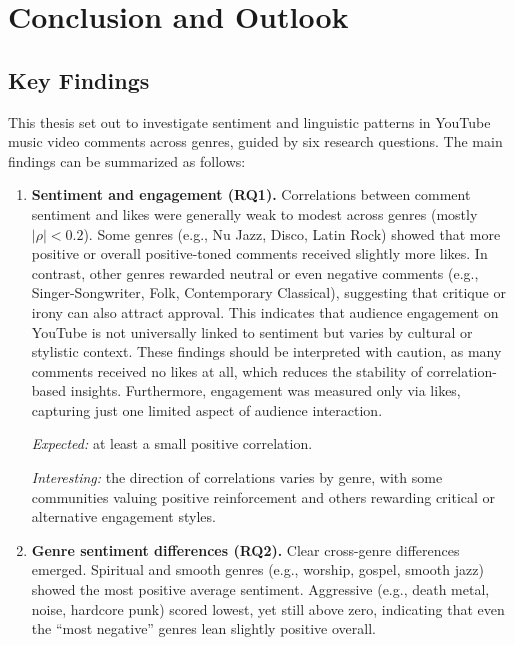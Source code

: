 \cleardoubleoddpage
\chapter{Conclusion and Outlook}
\label{sec:conclusion}

\section{Key Findings}
\label{subsec:results_keyfindings}

This thesis set out to investigate sentiment and linguistic patterns in YouTube music video comments across genres, guided by six research questions.  
The main findings can be summarized as follows:


\begin{enumerate}
\item \textbf{Sentiment and engagement (RQ1).}  
Correlations between comment sentiment and likes were generally weak to modest across genres (mostly $|\rho| < 0.2$).  
Some genres (e.g., Nu Jazz, Disco, Latin Rock) showed that more positive or overall positive-toned comments received slightly more likes.  
In contrast, other genres rewarded neutral or even negative comments (e.g., Singer-Songwriter, Folk, Contemporary Classical), suggesting that critique or irony can also attract approval.  
This indicates that audience engagement on YouTube is not universally linked to sentiment but varies by cultural or stylistic context.  
These findings should be interpreted with caution, as many comments received no likes at all, which reduces the stability of correlation-based insights.  
Furthermore, engagement was measured only via likes, capturing just one limited aspect of audience interaction.  

\textit{Expected:} at least a small positive correlation.  

\textit{Interesting:} the direction of correlations varies by genre, with some communities valuing positive reinforcement and others rewarding critical or alternative engagement styles.

\item \textbf{Genre sentiment differences (RQ2).}  
Clear cross-genre differences emerged. Spiritual and smooth genres (e.g., worship, gospel, smooth jazz) showed the most positive average sentiment.  
Aggressive (e.g., death metal, noise, hardcore punk) scored lowest, yet still above zero, indicating that even the “most negative” genres lean slightly positive overall.  


\end{enumerate}
